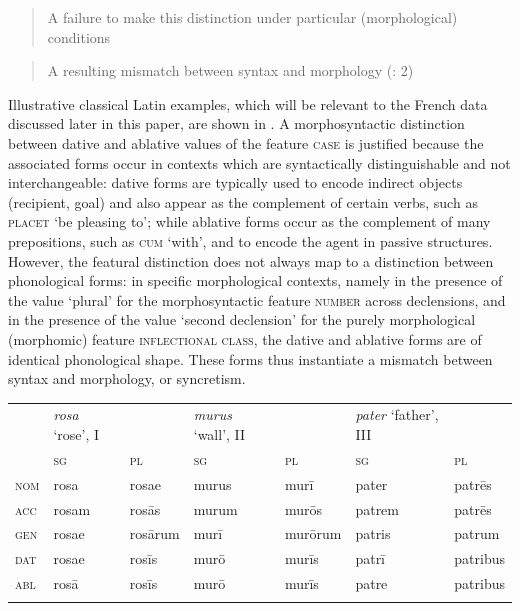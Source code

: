 \documentclass[output=paper]{langscibook}
\begin{document}
\begin{quote}
A failure to make this distinction under particular (morphological) conditions
\end{quote}

\begin{quote}
A resulting mismatch between syntax and morphology (\citealt{BaermanEtAl2005}: 2)
\end{quote}

Illustrative classical Latin examples, which will be relevant to the French data discussed later in this paper, are shown in . A morphosyntactic distinction between dative and ablative values of the feature \textsc{case} is justified because the associated forms occur in contexts which are syntactically distinguishable and not interchangeable: dative forms are typically used to encode indirect objects (recipient, goal) and also appear as the complement of certain verbs, such as \textsc{placet} ‘be pleasing to’; while ablative forms occur as the complement of many prepositions, such as \textsc{cum} ‘with’, and to encode the agent in passive structures. However, the featural distinction does not always map to a distinction between phonological forms: in specific morphological contexts, namely in the presence of the value ‘plural’ for the morphosyntactic feature \textsc{number} across declensions, and in the presence of the value ‘second declension’ for the purely morphological (morphomic) feature \textsc{inflectional} \textsc{class}, the dative and ablative forms are of identical phonological shape. These forms thus instantiate a mismatch between syntax and morphology, or syncretism. 


\begin{tabularx}{\textwidth}{XXXXXXX}
 & \textit{rosa} ‘rose’, I &  & \textit{murus} ‘wall’, II &  & \textit{pater} ‘father’, III & \\
\lsptoprule
& \textsc{sg} & \textsc{pl} & \textsc{sg} & \textsc{pl} & \textsc{sg} & \textsc{pl}\\
\textsc{nom} & rosa & rosae & murus & murī & pater & patrēs\\
\textsc{acc} & rosam & rosās & murum & murōs & patrem & patrēs\\
\textsc{gen} & rosae & rosārum & murī & murōrum & patris & patrum\\
\textsc{dat} & rosae & rosīs & murō & murīs & patrī & patribus\\
\textsc{abl} & rosā & rosīs & murō & murīs & patre & patribus\\
\lspbottomrule
\end{tabularx}
\begin{stylelsTableHeading}%
\begin{table}
\caption{Singular and plural forms of first–declension \textit{rosa} ‘rose’, second–declension \textit{murus} ‘wall’ and third–declension \textit{pater} ‘father’ in classical Latin.}
\label{tab:key:1}
\end{table}\end{stylelsTableHeading}
\end{document}
